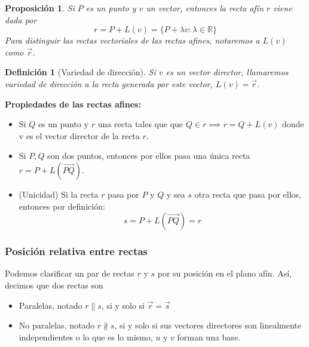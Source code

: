 \documentclass[11pt, a4paper, titlepage]{article}
\makeatletter
\renewenvironment{proof}[1][\proofname] {\vspace{-15pt}\par\pushQED{\qed}\normalfont\topsep6\p@\@plus6\p@\relax\trivlist\item[\hskip\labelsep\it#1\@addpunct{.}]\ignorespaces}{\popQED\endtrivlist\@endpefalse}
\newcommand{\R}{\mathbb{R}}
\theoremstyle{theorem-style}
\newtheorem*{nprop}{Proposición}
\theoremstyle{definition-style}
\newtheorem*{ndef}{Definición}
\theoremstyle{remark-style}
\theoremstyle{example-style}
\makeatother
\begin{document}
\begin{nprop}
	Si $P$ es un punto y $v$ un vector, entonces la recta afín $r$ viene dada por
	\[
	r = P+L(v) = \{P + \lambda v : \lambda \in \R\}
	\]
	Para distinguir las rectas vectoriales de las rectas afines, notaremos a $L(v)$ como $\vec{r}$.
\end{nprop}
\begin{ndef}[Variedad de dirección]
	Si $v$ es un \textit{vector director}, llamaremos \textit{variedad de dirección} a la recta generada por este vector, $L(v) = \vec{r}$.
\end{ndef}

\textbf{Propiedades de las rectas afines:}
\begin{itemize}
	\item Si $Q$ es un punto y $r$ una recta tales que que $Q\in r \implies r = Q +L(v)$ donde v es el vector director de la recta $r$.
	\item Si $P,Q$ son dos puntos, entonces por ellos pasa una única recta $r = P +L(\overrightarrow{PQ})$. \\
	\begin{proof}
	(Unicidad) Si la recta $r$ pasa por $P$ y $Q$ y sea $s$ otra recta que pasa por ellos, entonces por definición:
	\[
	s = P+L(\overrightarrow{PQ}) = r
	\]
\end{proof}
\end{itemize}

\subsubsection{Posición relativa entre rectas}

Podemos clasificar un par de rectas $r$ y $s$ por su posición en el plano afín. Así, decimos que dos rectas son

\begin{itemize}
	\item Paralelas, notado $r\parallel s$, si y solo si $\vec{r} = \vec{s}$
	\item No paralelas, notado $r\nparallel s$, si y solo si sus vectores directores son linealmente independientes o lo que es lo mismo, $u$ y $v$ forman una base.
\end{itemize}
\end{document}
